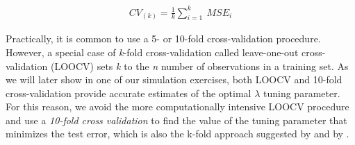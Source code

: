 \begin{align}
    \label{}
    CV_{(k)}=\frac{1}{k}\sum_{i=1}^{k} \: MSE_i
\end{align} 

\noindent Practically, it is common to use a 5- or 10-fold cross-validation procedure. However, a special case of \textit{k}-fold cross-validation called leave-one-out cross-validation (LOOCV) sets \textit{k} to the \textit{n} number of observations in a training set. As we will later show in one of our simulation exercises, both LOOCV and 10-fold cross-validation provide accurate estimates of the optimal $\lambda$ tuning parameter. For this reason, we avoid the more computationally intensive LOOCV procedure and use a \textit{10-fold cross validation} to find the value of the tuning parameter that minimizes the test error, which is also the k-fold approach suggested by \cite{zou2005regularization} and by \cite{tibshirani1996regression}.
